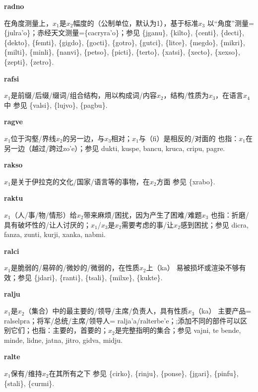 \documentclass[notitlepage,twocolumn,a4paper,10pt]{book}
\begin{document}
{\sffamily\bfseries radno}\enspace {\ttfamily\bfseries[        ra'o]}  在角度测量上，$x_1$是$x_2$幅度的（公制单位，默认为1），基于标准$x_3$ \textemdash{} 以“角度”测量=\{julra'o\}；赤经天文测量=\{cacryra'o\}；参见 \{jganu\}, \{kilto\}, \{centi\}, \{decti\}, \{dekto\}, \{femti\}, \{gigdo\}, \{gocti\}, \{gotro\}, \{gutci\}, \{litce\}, \{megdo\}, \{mikri\}, \{milti\}, \{minli\}, \{nanvi\}, \{petso\}, \{picti\}, \{terto\}, \{xatsi\}, \{xecto\}, \{xexso\}, \{zepti\}, \{zetro\}.

{\sffamily\bfseries rafsi}\enspace {\ttfamily\bfseries[raf]}  $x_1$是前缀\slash{}后缀\slash{}缀词\slash{}组合结构，用以构成词\slash{}内容$x_2$，结构\slash{}性质为$x_3$，在语言$x_4$中 \textemdash{} 参见 \{valsi\}, \{lujvo\}, \{pagbu\}.

{\sffamily\bfseries ragve}\enspace {\ttfamily\bfseries[rav]}  $x_1$位于沟壑\slash{}界线$x_2$的另一边，与$x_3$相对；$x_1$与（fi）是相反的\slash{}对面的 \textemdash{} 也指：$x_1$在另一边（越过\slash{}跨过zo'e）；参见 {dukti}, {kuspe}, {bancu}, {kruca}, {cripu}, {pagre}.

{\sffamily\bfseries rakso} $x_1$是关于伊拉克的文化\slash{}国家\slash{}语言等的事物，在$x_2$方面 \textemdash{} 参见 \{xrabo\}.

{\sffamily\bfseries raktu}\enspace {\ttfamily\bfseries[        ra'u]}  $x_1$（人\slash{}事\slash{}物\slash{}情形）给$x_2$带来麻烦\slash{}困扰，因为产生了困难\slash{}难题$x_3$ \textemdash{} 也指：折磨\slash{}具有破坏性的\slash{}让人讨厌的；$x_1$\slash{}$x_3$是$x_2$需要考虑的事\slash{}让$x_2$感到困扰；参见 {dicra}, {fanza}, {zunti}, {kurji}, {xanka}, {nabmi}.

{\sffamily\bfseries ralci}\enspace {\ttfamily\bfseries[rac]}  $x_1$是脆弱的\slash{}易碎的\slash{}微妙的\slash{}微弱的，在性质$x_2$上（ka） \textemdash{} 易被损坏或渲染不够有效；参见 \{jdari\}, \{ranti\}, \{tsali\}, \{milxe\}, \{kukte\}.

{\sffamily\bfseries ralju}\enspace {\ttfamily\bfseries[ral]}  $x_1$是$x_2$（集合）中的最主要的\slash{}领导\slash{}主席\slash{}负责人，具有性质$x_3$（ka） \textemdash{} 主要产品= {ralselpra}；将军\slash{}总统\slash{}主席\slash{}领导人= {ralja'a}\slash{}{ralterbe'e}；;添加不同的部件可以区别它们；也指：主要的，首要的；$x_2$是完整指明的集合；参见 {vajni}, te {bende}, {minde}, {lidne}, {jatna}, {jitro}, {gidva}, {midju}.

{\sffamily\bfseries ralte}\enspace {\ttfamily\bfseries[        ra'e]}  $x_1$保有\slash{}维持$x_2$在其所有之下 \textemdash{} 参见 \{cirko\}, \{rinju\}, \{ponse\}, \{jgari\}, \{pinfu\}, \{stali\}, \{curmi\}.
\end{document}
